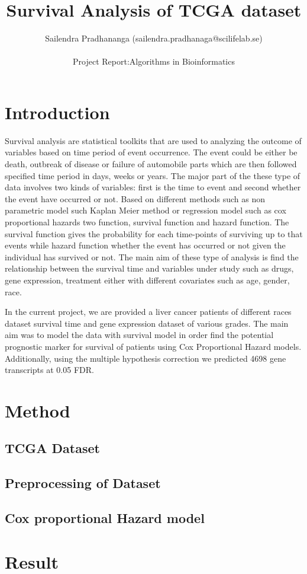 \documentclass[a4paper,10pt]{article}
\title{Survival Analysis of TCGA dataset}
\author{ Sailendra Pradhananga (sailendra.pradhanaga@scilifelab.se)\\ \\
			Project Report:Algorithms in Bioinformatics}
\begin{document}
\maketitle

\section{Introduction}


Survival analysis are statistical toolkits that are used to analyzing the outcome of variables based on time period of event occurrence. The event could be either be death, outbreak of disease or failure of automobile parts which are then followed specified time period in days, weeks or years. The major part of the these type of data involves two kinds of variables: first is the time to event and second whether the event have occurred or not. Based on different methods such as non parametric model such Kaplan Meier method or regression model such as cox proportional hazards two function, survival function and hazard function. The survival function gives the probability  for each time-points of surviving up to that events while hazard function whether the event has occurred or not  given the individual has survived or not. The main aim of these type of analysis is find the relationship between the survival time and variables under study such as drugs, gene expression, treatment  either with different covariates such as age, gender, race.

In the current project, we are provided a liver cancer patients of different races  dataset survival time and gene expression dataset of various grades. The main aim was to model the data with survival model in order find the potential prognostic marker for survival of patients using Cox Proportional Hazard models. Additionally, using the multiple hypothesis correction we predicted 4698 gene transcripts at 0.05 FDR. 

\section{Method}

\subsection{TCGA Dataset}
\subsection {Preprocessing of Dataset}
\subsection{Cox proportional Hazard model}


 \section{Result}





\end{document}
